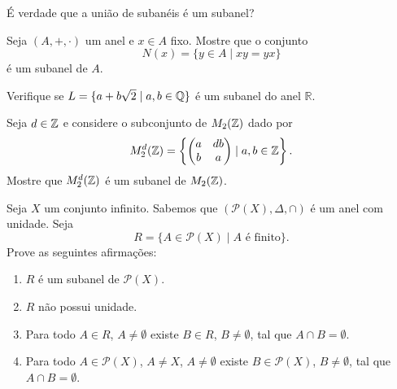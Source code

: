 \documentclass[12pt]{exam}
\begin{document}
    \vspace{.3cm}

    \questao{} \'E verdade que a uni\~ao de suban\'eis \'e um subanel?

    \vspace{.3cm}

    \questao{} Seja $(A, + , \cdot)$ um anel e $x \in A$ fixo. Mostre que o conjunto
    \[
        N(x) = \{y \in A \mid xy = yx\}
    \]
    \'e um subanel de $A$.

    \newpage

    \questao{} Verifique se $L = \{ a + b\sqrt{2} \mid a, b \in \mathbb{Q}\}$ {\'e} um subanel
    do anel $\mathbb{R}$.

    \vspace{.3cm}

    \questao{} Seja $d \in \mathbb{Z}$ e considere o subconjunto de $M_2(\mathbb{Z})$ dado por
    \[
        M_2^d(\mathbb{Z}) = \left\{\begin{pmatrix} a & db \\ b & a \end{pmatrix} \mid a, b \in \mathbb{Z}\right\}.
    \]
    Mostre que $M_2^d(\mathbb{Z})$ é um subanel de $M_2(\mathbb{Z})$.

    \vspace{.3cm}

    \questao{} Seja $X$ um conjunto infinito. Sabemos que $(\mathcal{P}(X), \Delta, \cap)$ é um anel com unidade. Seja
    \[
        R = \{A \in \mathcal{P}(X) \mid A \mbox{ é finito}\}.
    \]
    Prove as seguintes afirmações:
    \begin{enumerate}[label=({\alph*})]
        \item $R$ é um subanel de $\mathcal{P}(X)$.

        \item $R$ não possui unidade.

        \item Para todo $A \in R$, $A \ne \emptyset$ existe $B \in R$, $B \ne \emptyset$, tal que $A \cap B = \emptyset$.

        \item Para todo $A \in \mathcal{P}(X)$, $A \ne X$, $A \ne \emptyset$ existe $B \in \mathcal{P}(X)$, $B \ne \emptyset$, tal que $A \cap B = \emptyset$.
    \end{enumerate}

    \vspace{.6cm}
\end{document}
